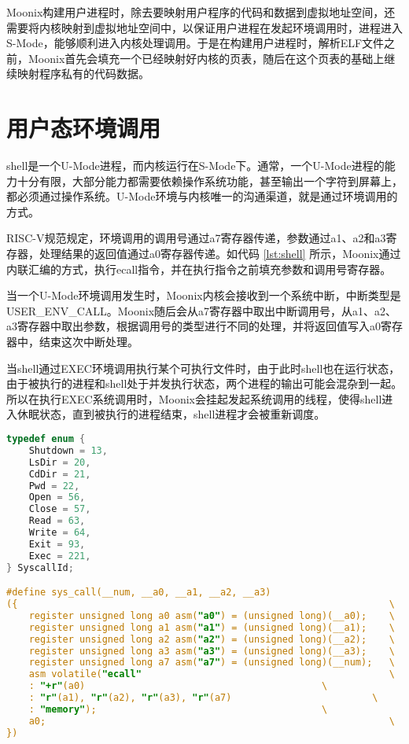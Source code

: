 Moonix构建用户进程时，除去要映射用户程序的代码和数据到虚拟地址空间，还需要将内核映射到虚拟地址空间中，以保证用户进程在发起环境调用时，进程进入S-Mode，能够顺利进入内核处理调用。于是在构建用户进程时，解析ELF文件之前，Moonix首先会填充一个已经映射好内核的页表，随后在这个页表的基础上继续映射程序私有的代码数据。

\section{用户态环境调用}

shell是一个U-Mode进程，而内核运行在S-Mode下。通常，一个U-Mode进程的能力十分有限，大部分能力都需要依赖操作系统功能，甚至输出一个字符到屏幕上，都必须通过操作系统。U-Mode环境与内核唯一的沟通渠道，就是通过环境调用的方式。

RISC-V规范规定，环境调用的调用号通过a7寄存器传递，参数通过a1、a2和a3寄存器，处理结果的返回值通过a0寄存器传递。如代码 \ref{lst:shell} 所示，Moonix通过内联汇编的方式，执行ecall指令，并在执行指令之前填充参数和调用号寄存器。

当一个U-Mode环境调用发生时，Moonix内核会接收到一个系统中断，中断类型是USER\_ENV\_CALL。Moonix随后会从a7寄存器中取出中断调用号，从a1、a2、a3寄存器中取出参数，根据调用号的类型进行不同的处理，并将返回值写入a0寄存器中，结束这次中断处理。

当shell通过EXEC环境调用执行某个可执行文件时，由于此时shell也在运行状态，由于被执行的进程和shell处于并发执行状态，两个进程的输出可能会混杂到一起。所以在执行EXEC系统调用时，Moonix会挂起发起系统调用的线程，使得shell进入休眠状态，直到被执行的进程结束，shell进程才会被重新调度。

\begin{minipage}[c]{0.95\textwidth}
\begin{lstlisting}[language={C}, caption={U-Mode环境调用}, label={lst:shell}]
typedef enum {
	Shutdown = 13,
	LsDir = 20,
	CdDir = 21,
	Pwd = 22,
	Open = 56,
	Close = 57,
	Read = 63,
	Write = 64,
	Exit = 93,
	Exec = 221,
} SyscallId;

#define sys_call(__num, __a0, __a1, __a2, __a3)                          \
({                                                                  \
	register unsigned long a0 asm("a0") = (unsigned long)(__a0);    \
	register unsigned long a1 asm("a1") = (unsigned long)(__a1);    \
	register unsigned long a2 asm("a2") = (unsigned long)(__a2);    \
	register unsigned long a3 asm("a3") = (unsigned long)(__a3);    \
	register unsigned long a7 asm("a7") = (unsigned long)(__num);   \
	asm volatile("ecall"                                            \
	: "+r"(a0)                                          \
	: "r"(a1), "r"(a2), "r"(a3), "r"(a7)                         \
	: "memory");                                        \
	a0;                                                             \
})
\end{lstlisting}
\end{minipage}

